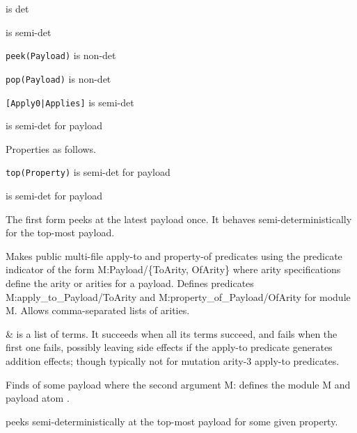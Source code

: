 \begin{shortlist}
    \item {} is det
    \item {} is semi-det
    \item \verb$peek(Payload)$ is non-det
    \item \verb$pop(Payload)$ is non-det
    \item \verb$[Apply0|Applies]$ is semi-det
    \item {} is semi-det for payload
\end{shortlist}

Properties as follows.

\begin{shortlist}
    \item \verb$top(Property)$ is semi-det for payload
    \item {} is semi-det for payload
\end{shortlist}

The first form  peeks at the latest payload once. It behaves
semi-deterministically for the top-most payload.\vspace{0.7cm}

\begin{description}
Makes public multi-file apply-to and property-of predicates using
the predicate indicator  of the form M:Payload/\{ToArity, OfArity\}
where arity specifications define the arity or arities for a
payload. Defines predicates M:apply_to_Payload/ToArity and
M:property_of_Payload/OfArity for module M. Allows comma-separated
lists of arities.

\nodescription

\begin{arguments}
 & is a list of  terms. It succeeds when all its
 terms succeed, and fails when the first one fails, possibly
leaving side effects if the apply-to predicate generates addition
effects; though typically not for mutation arity-3 apply-to
predicates. \\
\end{arguments}

Finds  of some payload where the second argument M:
defines the module M and payload atom .

  peeks semi-deterministically at the top-most payload
for some given property.
\end{description}

